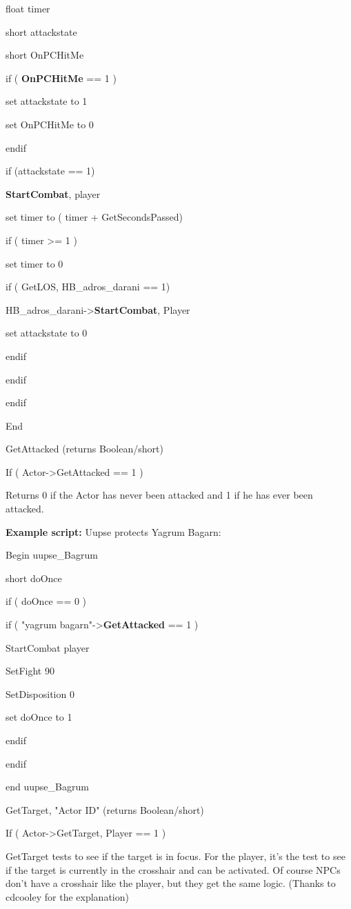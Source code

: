 \documentclass[
]{article}
\begin{document}
float timer

short attackstate

short OnPCHitMe

if ( \textbf{OnPCHitMe} == 1 )

set attackstate to 1

set OnPCHitMe to 0

endif

if (attackstate == 1)

\textbf{StartCombat}, player

set timer to ( timer + GetSecondsPassed)

if ( timer \textgreater= 1 )

set timer to 0

if ( GetLOS, HB\_adros\_darani == 1)

HB\_adros\_darani-\textgreater{}\textbf{StartCombat}, Player

set attackstate to 0

endif

endif

endif

End

GetAttacked (returns Boolean/short)

If ( Actor-\textgreater GetAttacked == 1 )

Returns 0 if the Actor has never been attacked and 1 if he has ever been
attacked.

\textbf{Example script:} Uupse protects Yagrum Bagarn:

Begin uupse\_Bagrum

short doOnce

if ( doOnce == 0 )

if ( "yagrum bagarn"-\textgreater{}\textbf{GetAttacked} == 1 )

StartCombat player

SetFight 90

SetDisposition 0

set doOnce to 1

endif

endif

end uupse\_Bagrum

GetTarget, "Actor ID" (returns Boolean/short)

If ( Actor-\textgreater GetTarget, Player == 1 )

GetTarget tests to see if the target is in focus. For the player, it's
the test to see if the target is currently in the crosshair and can be
activated. Of course NPCs don't have a crosshair like the player, but
they get the same logic. (Thanks to cdcooley for the explanation)
\end{document}
